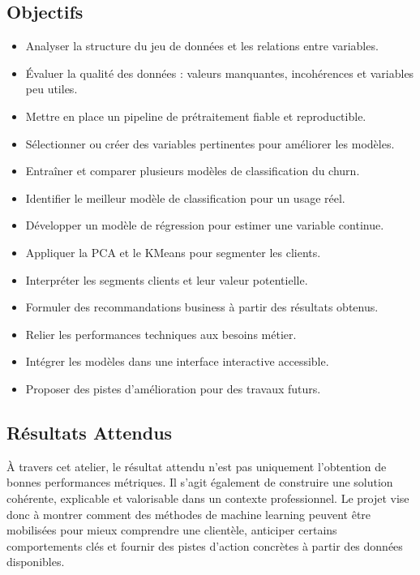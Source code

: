 \documentclass[11pt,a4paper]{article}
\begin{document}
\subsection{Objectifs}
\begin{itemize}
    \item Analyser la structure du jeu de données et les relations entre variables.
    \item Évaluer la qualité des données : valeurs manquantes, incohérences et variables peu utiles.
    \item Mettre en place un pipeline de prétraitement fiable et reproductible.
    \item Sélectionner ou créer des variables pertinentes pour améliorer les modèles.
    \item Entraîner et comparer plusieurs modèles de classification du churn.
    \item Identifier le meilleur modèle de classification pour un usage réel.
    \item Développer un modèle de régression pour estimer une variable continue.
    \item Appliquer la PCA et le KMeans pour segmenter les clients.
    \item Interpréter les segments clients et leur valeur potentielle.
    \item Formuler des recommandations business à partir des résultats obtenus.
    \item Relier les performances techniques aux besoins métier.
    \item Intégrer les modèles dans une interface interactive accessible.
    \item Proposer des pistes d'amélioration pour des travaux futurs.
\end{itemize}

\subsection{Résultats Attendus}
À travers cet atelier, le résultat attendu n'est pas uniquement l'obtention de bonnes performances métriques. Il s'agit également de construire une solution cohérente, explicable et valorisable dans un contexte professionnel. Le projet vise donc à montrer comment des méthodes de machine learning peuvent être mobilisées pour mieux comprendre une clientèle, anticiper certains comportements clés et fournir des pistes d'action concrètes à partir des données disponibles.

\clearpage
\end{document}
